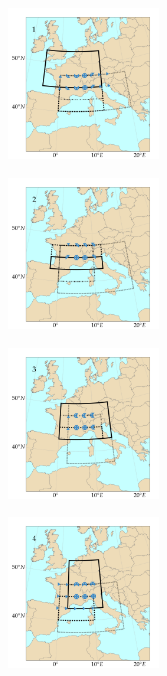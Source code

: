 \documentclass[twocol]{ametsoc}
\begin{document}
\begin{figure}[htb]
	\centering
	\begin{subfigure}{.5\columnwidth}
		\centering
		\includegraphics[width=4cm]{figures/spatial_win_z4-hi4/Spatial_windows_1.png}
	\end{subfigure}%
	\begin{subfigure}{.5\columnwidth}
		\centering
		\includegraphics[width=4cm]{figures/spatial_win_z4-hi4/Spatial_windows_2.png}
	\end{subfigure}
	\begin{subfigure}{.5\columnwidth}
		\centering
		\includegraphics[width=4cm]{figures/spatial_win_z4-hi4/Spatial_windows_3.png}
	\end{subfigure}%
	\begin{subfigure}{.5\columnwidth}
		\centering
		\includegraphics[width=4cm]{figures/spatial_win_z4-hi4/Spatial_windows_4.png}

\end{subfigure}
\end{figure}
\end{document}
